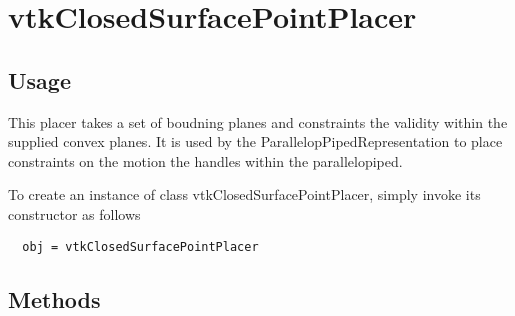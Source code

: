 \section{vtkClosedSurfacePointPlacer}

\subsection{Usage}

 This placer takes a set of boudning planes and constraints the validity
 within the supplied convex planes. It is used by the 
 ParallelopPipedRepresentation to place constraints on the motion the 
 handles within the parallelopiped.
 

To create an instance of class vtkClosedSurfacePointPlacer, simply
invoke its constructor as follows
\begin{verbatim}
  obj = vtkClosedSurfacePointPlacer
\end{verbatim}
\subsection{Methods}

